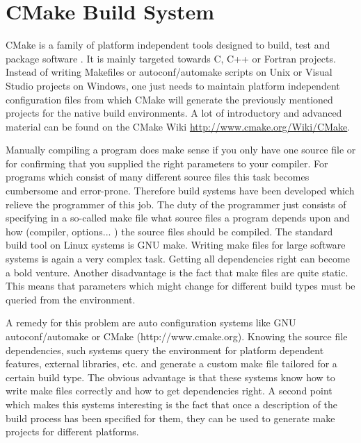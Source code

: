 \section{CMake Build System}
\label{sec:cmake}

CMake is  a family of platform  independent tools designed to  build, test and
package  software  \cite{cmake,  Schroeder2004,  Martin2007a}.  It  is  mainly
targeted towards C,  C++ or Fortran projects. Instead  of writing Makefiles or
autoconf/automake scripts  on Unix or  Visual Studio projects on  Windows, one
just  needs to maintain  platform independent  configuration files  from which
CMake will  generate the  previously mentioned projects  for the  native build
environments. A lot of introductory and advanced material can be found on the
CMake Wiki \url{http://www.cmake.org/Wiki/CMake}.


Manually compiling a program does make sense if you only have one source file or for confirming that you supplied the right parameters to your compiler. For programs which consist of many different source files this task becomes cumbersome and error-prone. Therefore build systems have been developed which relieve the programmer of this job. The duty of the programmer just consists of specifying in a so-called make file what source files a program depends upon and how (compiler, options... ) the source files should be compiled. The standard build tool on Linux systems is GNU make. Writing make files for large software systems is again a very complex task. Getting all dependencies right can become a bold venture. Another disadvantage is the fact that make files are quite static. This means that parameters which might change for different build types must be queried from the environment.

A remedy for this problem are auto configuration systems like GNU autoconf/automake or CMake (http://www.cmake.org). Knowing the source file dependencies, such systems query the environment for platform dependent features, external libraries, etc. and generate a custom make file tailored for a certain build type. The obvious advantage is that these systems know how to write make files correctly and how to get dependencies right. A second point which makes this systems interesting is the fact that once a description of the build process has been specified for them, they can be used to generate make projects for different platforms.

